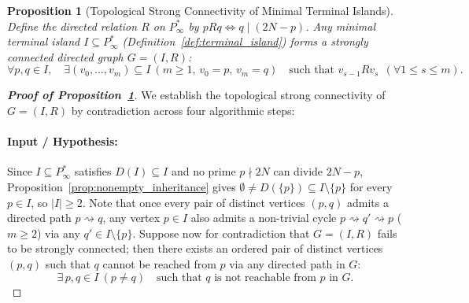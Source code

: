 \documentclass[11pt,a4paper]{article}
\newtheorem{proposition}[theorem]{Proposition}
\theoremstyle{definition}
\begin{document}
\begin{proposition}[Topological Strong Connectivity of Minimal Terminal Islands]
\label{prop:strong_connectivity}
Define the directed relation $R$ on $P^*_\infty$ by $p R q \iff q \mid (2N - p)$. Any minimal terminal island $I \subseteq P^*_\infty$ (Definition~\ref{def:terminal_island}) forms a strongly connected directed graph $G = (I, R)$:
\[
\forall p, q \in I, \quad \exists (v_0, \dots, v_m) \subseteq I \ (m \ge 1, \, v_0 = p, \, v_m = q) \quad \text{such that } v_{s-1} R v_s \ \ (\forall 1 \le s \le m).
\]
\end{proposition}
\begin{proof}[\textbf{Proof of Proposition~\ref{prop:strong_connectivity}}]
We establish the topological strong connectivity of $G = (I, R)$ by contradiction across four algorithmic steps:

\paragraph{Input / Hypothesis:}
Since $I \subseteq P^*_\infty$ satisfies $D(I) \subseteq I$ and no prime $p \nmid 2N$ can divide $2N - p$, Proposition~\ref{prop:nonempty_inheritance} gives $\emptyset \neq D(\{p\}) \subseteq I \setminus \{p\}$ for every $p \in I$, so $|I| \ge 2$. Note that once every pair of distinct vertices $(p, q)$ admits a directed path $p \rightsquigarrow q$, any vertex $p \in I$ also admits a non-trivial cycle $p \rightsquigarrow q' \rightsquigarrow p$ ($m \ge 2$) via any $q' \in I \setminus \{p\}$. Suppose now for contradiction that $G = (I, R)$ fails to be strongly connected; then there exists an ordered pair of distinct vertices $(p, q)$ such that $q$ cannot be reached from $p$ via any directed path in $G$:
\begin{equation}
\label{eq:strong_conn_hyp}
\exists\, p, q \in I \ (p \neq q) \quad \text{such that } q \text{ is not reachable from } p \text{ in } G.
\end{equation}


\end{proof}
\end{document}
